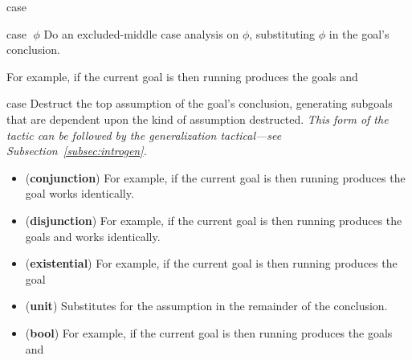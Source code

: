 \begin{tactic}{case}
  \begin{tsyntax}{case $\;\phi$}
    Do an excluded-middle case analysis on $\phi$, substituting $\phi$
    in the goal's conclusion.

    For example, if the current goal is
     then
    running 
    produces the goals
    and
  \end{tsyntax}

  \begin{tsyntax}{case}
    Destruct the top assumption of the goal's conclusion, generating
    subgoals that are dependent upon the kind of assumption
    destructed. \emph{This form of the tactic can be followed by
    the generalization tactical---see Subsection~\ref{subsec:introgen}.}

    \begin{itemize}
    \item (\textbf{conjunction})
    For example, if the current goal is
     then
    running 
    produces the goal
    \ec{&&} works identically.

    \item (\textbf{disjunction})
    For example, if the current goal is
     then
    running 
    produces the goals
    and
    \ec{||} works identically.

    \item (\textbf{existential})
    For example, if the current goal is
     then
    running 
    produces the goal

    \item (\textbf{unit}) Substitutes  for the assumption in
      the remainder of the conclusion.

    \item (\textbf{bool})
    For example, if the current goal is
     then
    running 
    produces the goals
    and


\end{itemize}
\end{tsyntax}
\end{tactic}
